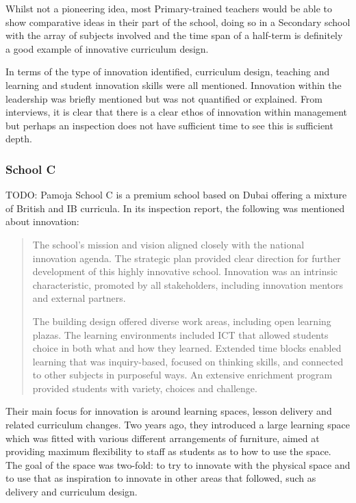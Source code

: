 Whilst not a pioneering idea, most Primary-trained teachers would be able to show comparative ideas in their part of the school, doing so in a Secondary school with the array of subjects involved and the time span of a half-term is definitely a good example of innovative curriculum design.

In terms of the type of innovation identified, curriculum design, teaching and learning and student innovation skills were all mentioned. Innovation within the leadership was briefly mentioned but was not quantified or explained. From interviews, it is clear that there is a clear ethos of innovation within management but perhaps an inspection does not have sufficient time to see this is sufficient depth. 

\subsubsection{School C}
TODO: Pamoja
School C is a premium school based on Dubai offering a mixture of British and IB curricula. In its inspection report, the following was mentioned about innovation:

\begin{quote}
The school's mission and vision aligned closely with the national innovation agenda. The strategic plan provided clear direction for further development of this highly innovative school. Innovation was an intrinsic characteristic, promoted by all stakeholders, including innovation mentors and external partners.

The building design offered diverse work areas, including open learning plazas. The learning environments included ICT that allowed students choice in both what and how they learned. Extended time blocks enabled learning that was inquiry-based, focused on thinking skills, and connected to other subjects in purposeful ways. An extensive enrichment program provided students with variety, choices and challenge.
\end{quote}

Their main focus for innovation is around learning spaces, lesson delivery and related curriculum changes. Two years ago, they introduced a large learning space which was fitted with various different arrangements of furniture, aimed at providing maximum flexibility to staff as students as to how to use the space. The goal of the space was two-fold: to try to innovate with the physical space and to use that as inspiration to innovate in other areas that followed, such as delivery and curriculum design. 

